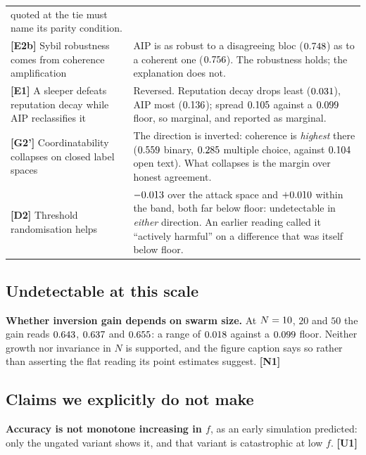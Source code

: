 \begin{table}[t]
\begin{tabular}{@{}p{}p{}@{}}
quoted at the tie must name its parity condition. \\
\addlinespace
\textbf{[E2b]} Sybil robustness comes from coherence amplification &
AIP is as robust to a disagreeing bloc ($0.748$) as to a
coherent one ($0.756$). The robustness holds; the explanation does
not. \\
\addlinespace
\textbf{[E1]} A sleeper defeats reputation decay while AIP reclassifies it &
Reversed. Reputation decay drops least ($0.031$), AIP most
($0.136$); spread $0.105$ against a
$0.099$ floor, so marginal, and reported as marginal. \\
\addlinespace
\textbf{[G2']} Coordinatability collapses on closed label spaces &
The direction is inverted: coherence is \emph{highest} there
($0.559$ binary, $0.285$ multiple choice, against
$0.104$ open text). What collapses is the margin over honest
agreement. \\
\addlinespace
\textbf{[D2]} Threshold randomisation helps &
$-0.013$ over the attack space and $+0.010$ within
the band, both far below floor: undetectable in \emph{either} direction. An earlier reading called it
``actively harmful'' on a difference that was itself below floor. \\
\bottomrule
\end{tabular}
\end{table}

\subsection{Undetectable at this scale}

\textbf{Whether inversion gain depends on swarm size.} At $N=10$, $20$
and $50$ the gain reads $0.643$, $0.637$ and
$0.655$: a range of $0.018$ against a
$0.099$ floor. Neither growth nor invariance in $N$ is supported, and
the figure caption says so rather than asserting the flat reading its point
estimates suggest. \textbf{[N1]}

\subsection{Claims we explicitly do not make}

\textbf{Accuracy is not monotone increasing in $f$}, as an early simulation
predicted: only the ungated variant shows it, and that variant is catastrophic at
low $f$. \textbf{[U1]}

